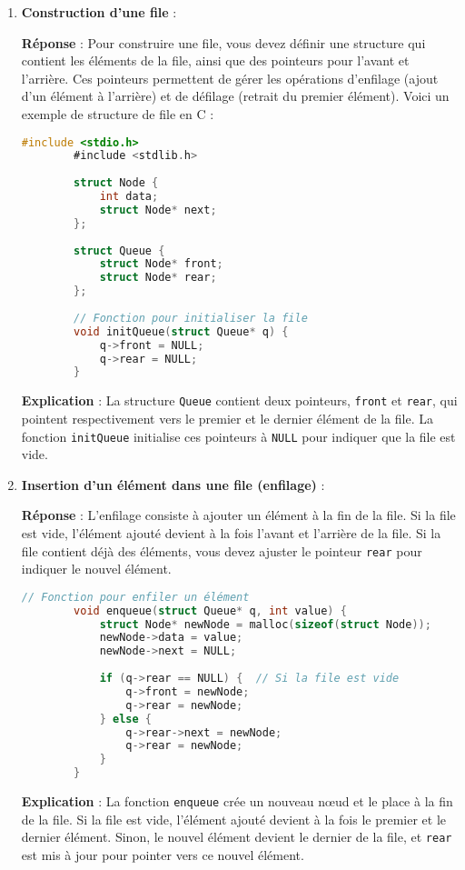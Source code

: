 \begin{enumerate}
	\item \textbf{Construction d'une file} :
	
	\textbf{Réponse} :
	Pour construire une file, vous devez définir une structure qui contient les éléments de la file, ainsi que des pointeurs pour l'avant et l'arrière. Ces pointeurs permettent de gérer les opérations d'enfilage (ajout d'un élément à l'arrière) et de défilage (retrait du premier élément). Voici un exemple de structure de file en C :
	
	\begin{lstlisting}[language=C]
		#include <stdio.h>
		#include <stdlib.h>
		
		struct Node {
			int data;
			struct Node* next;
		};
		
		struct Queue {
			struct Node* front;
			struct Node* rear;
		};
		
		// Fonction pour initialiser la file
		void initQueue(struct Queue* q) {
			q->front = NULL;
			q->rear = NULL;
		}
	\end{lstlisting}
	
	\textbf{Explication} :
	La structure \texttt{Queue} contient deux pointeurs, \texttt{front} et \texttt{rear}, qui pointent respectivement vers le premier et le dernier élément de la file. La fonction \texttt{initQueue} initialise ces pointeurs à \texttt{NULL} pour indiquer que la file est vide.
	
	\item \textbf{Insertion d'un élément dans une file (enfilage)} :
	
	\textbf{Réponse} :
	L'enfilage consiste à ajouter un élément à la fin de la file. Si la file est vide, l'élément ajouté devient à la fois l'avant et l'arrière de la file. Si la file contient déjà des éléments, vous devez ajuster le pointeur \texttt{rear} pour indiquer le nouvel élément.
	
	\begin{lstlisting}[language=C]
		// Fonction pour enfiler un élément
		void enqueue(struct Queue* q, int value) {
			struct Node* newNode = malloc(sizeof(struct Node));
			newNode->data = value;
			newNode->next = NULL;
			
			if (q->rear == NULL) {  // Si la file est vide
				q->front = newNode;
				q->rear = newNode;
			} else {
				q->rear->next = newNode;
				q->rear = newNode;
			}
		}
	\end{lstlisting}
	
	\textbf{Explication} :
	La fonction \texttt{enqueue} crée un nouveau nœud et le place à la fin de la file. Si la file est vide, l'élément ajouté devient à la fois le premier et le dernier élément. Sinon, le nouvel élément devient le dernier de la file, et \texttt{rear} est mis à jour pour pointer vers ce nouvel élément.
	

\end{enumerate}

